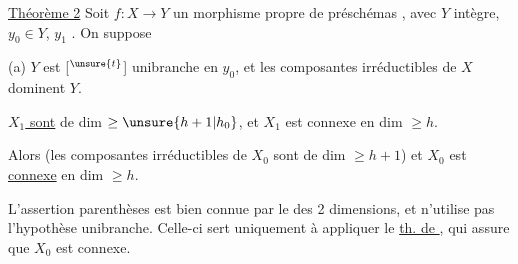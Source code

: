 
\uline{Théorème 2} Soit $f:X\longrightarrow Y$ un
morphisme  propre de
préschémas  , avec $Y$ intègre,
$y_0\in Y$, $y_1$ 
.
On suppose

 (a) $Y$ est [$^{\unsure{t}}$] unibranche en $y_0$,
et les composantes irréductibles de
$X$ dominent $Y$.

 \uline{$X_1$ sont} de dim $\geq\unsure{h+1|h_0}$, et $X_1$ est
connexe en dim $\geq h$.

Alors (les composantes irréductibles
de $X_0$ sont de dim $\geq h+1$) et
$X_0$ est \uline{connexe} en dim $\geq h$.

L'assertion  parenthèses est
bien connue par le  des 2
dimensions, et n'utilise pas l'hypothèse
unibranche. Celle-ci sert uniquement
à appliquer le \uline{th. de },
qui assure que $X_0$ est connexe.

